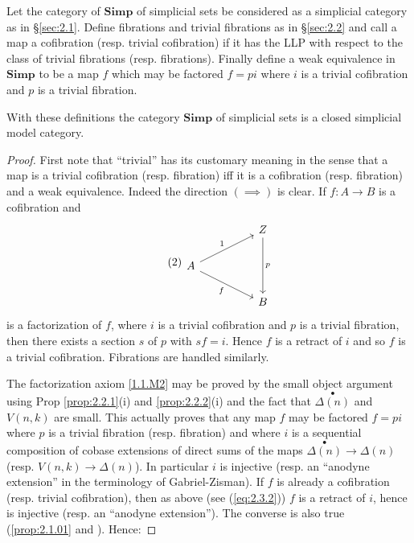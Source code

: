 \documentclass[../main]{subfiles}
\begin{document}
Let the category of $\mathbf{Simp}$ of simplicial sets be considered as a simplicial category as in \S\ref{sec:2.1}. Define fibrations and trivial fibrations as in \S\ref{sec:2.2} and call a map a cofibration (resp. trivial cofibration) if it has the LLP with respect to the class of trivial fibrations (resp. fibrations). Finally define a weak equivalence in $\mathbf{Simp}$ to be a map $f$ which may be factored $f = pi$ where $i$ is a trivial cofibration and $p$ is a trivial fibration.

\begin{theorem}\label{thm:2.3.3}
With these definitions the category $\mathbf{Simp}$ of simplicial sets is a closed simplicial model category.
\end{theorem}

\begin{proof}
First note that ``trivial'' has its customary meaning in the sense that a map is a trivial cofibration (resp. fibration) iff it is a cofibration (resp. fibration) and a weak equivalence. Indeed the direction $(\implies)$ is clear. If $f \colon A \longrightarrow B$ is a cofibration and 
\begin{equation}\label{eq:2.3.2}\tag{2}
\begin{tikzcd}
	&& Z \\
	A \\
	&& B
	\arrow["p", from=1-3, to=3-3]
	\arrow["1", from=2-1, to=1-3]
	\arrow["f"', from=2-1, to=3-3]
\end{tikzcd}
\end{equation}
is a factorization of $f$, where $i$ is a trivial cofibration and $p$ is a trivial fibration, then there exists a section $s$ of $p$ with $sf = i$. Hence $f$ is a retract of $i$ and so $f$ is a trivial cofibration. Fibrations are handled similarly.

The factorization axiom \ref{1.1.M2} may be proved by the small object argument using Prop \ref{prop:2.2.1}(i) and \ref{prop:2.2.2}(i) and the fact that $\overset{\bullet}{\Delta(n)}$ and $V(n, k)$ are small. This actually proves that any map $f$ may be factored $f=pi$ where $p$ is a trivial fibration (resp. fibration) and where $i$ is a sequential composition of cobase extensions of direct sums of the maps $\overset{\bullet}{\Delta(n)} \longrightarrow \Delta (n)$ (resp. $V(n, k) \longrightarrow \Delta (n)$). In particular $i$ is injective (resp. an ``anodyne extension'' in the terminology of Gabriel-Zisman). If $f$ is already a cofibration (resp. trivial cofibration), then as above (see (\ref{eq:2.3.2})) $f$ is a retract of $i$, hence is injective (resp. an ``anodyne extension''). The converse is also true (\ref{prop:2.1.01} and \cite[3.1]{gabriel_calculus_1967}). Hence:
\end{proof}
\end{document}
